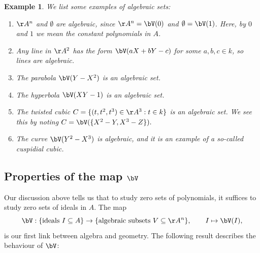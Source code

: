 \documentclass[12pt]{amsart}
\theoremstyle{plain}
\newtheorem{example}[theorem]{Example}
\begin{document}
\begin{example}\label{algsetex}
We list some examples of algebraic sets:
\begin{enumerate}
\item
$\AA^n$ and $\emptyset$ are algebraic, since $\AA^n = \bV(0)$ and $\emptyset = \bV(1)$.
Here, by $0$ and $1$ we mean the constant polynomials in $A$.

\item
Any line in $\AA^2$ has the form $\bV(aX+bY-c)$ for some $a, b, c \in k$, so lines are algebraic.

\item
The parabola $\bV(Y-X^2)$ is an algebraic set.

\item
The hyperbola $\bV(XY - 1)$ is an algebraic set.

\item
The twisted cubic $C = \{(t, t^2, t^3) \in \AA^3 : t \in k\}$ is an algebraic set.
We see this by noting $C = \bV(\{X^2 - Y, X^3 - Z\}).$

\item 
The curve $\bV(Y^2 - X^3)$ is algebraic, and it is an example of a so-called cuspidial cubic.
\end{enumerate}
\end{example}

\subsection{Properties of the map $\bV$}
Our discussion above tells us that to study zero sets of polynomials, it suffices to study zero sets of ideals in $A$.
The map
$$\bV : \{\text{ideals } I \subseteq A\} \to \{\text{algebraic subsets } V \subseteq \AA^n\}, \qquad I \mapsto \bV(I),$$
is our first link between algebra and geometry.
The following result describes the behaviour of $\bV$:
\end{document}
